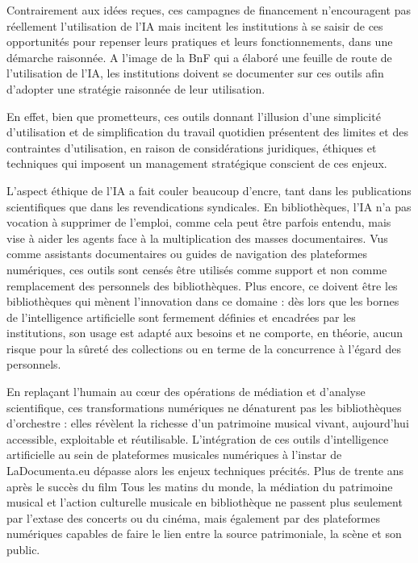 Contrairement aux idées reçues, ces campagnes de financement n'encouragent pas réellement l'utilisation de l'IA mais incitent les institutions à se saisir de ces opportunités pour repenser leurs pratiques et leurs fonctionnements, dans une démarche raisonnée. A l'image de la BnF qui a élaboré une feuille de route de l'utilisation de l'IA, les institutions doivent se documenter sur ces outils afin d'adopter une stratégie raisonnée de leur utilisation. 

En effet, bien que prometteurs, ces outils donnant l'illusion d'une simplicité d'utilisation et de simplification du travail quotidien présentent des limites et des contraintes d'utilisation, en raison de considérations juridiques, éthiques et techniques qui imposent un management stratégique conscient de ces enjeux. 


L'aspect éthique de l'IA a fait couler beaucoup d'encre, tant dans les publications scientifiques que dans les revendications syndicales. En bibliothèques, l'IA n'a pas vocation à supprimer de l'emploi, comme cela peut être parfois entendu, mais vise à aider les agents face à la multiplication des masses documentaires. Vus comme assistants documentaires ou guides de navigation des plateformes numériques, ces outils sont censés être utilisés comme support et non comme remplacement des personnels des bibliothèques. Plus encore, ce doivent être les bibliothèques qui mènent l'innovation dans ce domaine : dès lors que les bornes de l'intelligence artificielle sont fermement définies et encadrées par les institutions, son usage est adapté aux besoins et ne comporte, en théorie, aucun risque pour la sûreté des collections ou en terme de la concurrence à l'égard des personnels.




En replaçant l’humain au cœur des opérations de médiation et d’analyse scientifique, ces transformations numériques ne dénaturent pas les bibliothèques d’orchestre : elles révèlent la richesse d’un patrimoine musical vivant, aujourd’hui accessible, exploitable et réutilisable. L’intégration de ces outils d’intelligence artificielle au sein de plateformes musicales numériques à l’instar de LaDocumenta.eu dépasse alors les enjeux techniques précités. Plus de trente ans après le succès du film Tous les matins du monde, la médiation du patrimoine musical et l’action culturelle musicale en bibliothèque ne passent plus seulement par l’extase des concerts ou du cinéma, mais également par des plateformes numériques capables de faire le lien entre la source patrimoniale, la scène et son public. 

